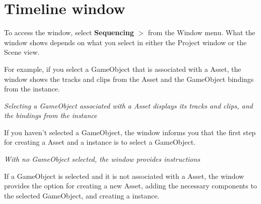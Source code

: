 \chapter{Timeline window}
\hypertarget{md__library_2_package_cache_2com_8unity_8timeline_0d1_87_86_2_documentation_0i_2tl__window}{}\label{md__library_2_package_cache_2com_8unity_8timeline_0d1_87_86_2_documentation_0i_2tl__window}
\label{md__library_2_package_cache_2com_8unity_8timeline_0d1_87_86_2_documentation_0i_2tl__window_autotoc_md1255}%
%
 To access the  window, select {\bfseries{Sequencing}} \texorpdfstring{$>$}{>} {\bfseries{}} from the Window menu. What the  window shows depends on what you select in either the Project window or the Scene view.

For example, if you select a Game\+Object that is associated with a  Asset, the  window shows the tracks and clips from the  Asset and the Game\+Object bindings from the  instance.



{\itshape Selecting a Game\+Object associated with a  Asset displays its tracks and clips, and the bindings from the  instance}

If you haven’t selected a Game\+Object, the  window informs you that the first step for creating a  Asset and a  instance is to select a Game\+Object.



{\itshape With no Game\+Object selected, the  window provides instructions}

If a Game\+Object is selected and it is not associated with a  Asset, the  window provides the option for creating a new  Asset, adding the necessary components to the selected Game\+Object, and creating a  instance.



